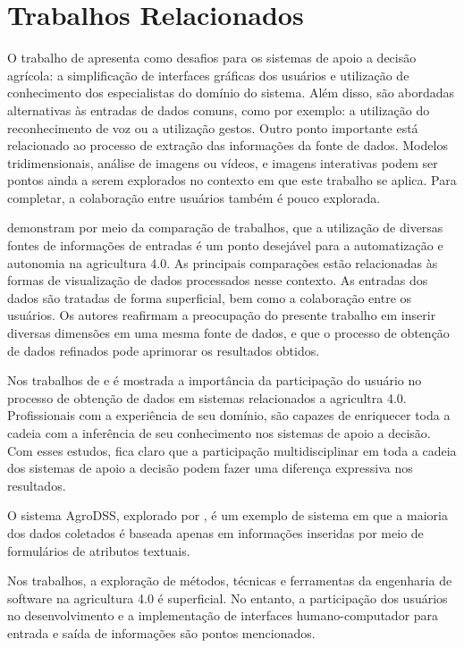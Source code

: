\documentclass[12pt]{article}
\begin{document}
\section{Trabalhos Relacionados}
\label{sec:trabalhos_relacionados}

O trabalho de  apresenta como desafios para os sistemas de apoio a decisão agrícola: a simplificação de interfaces gráficas dos usuários e utilização de conhecimento dos especialistas do domínio do sistema. Além disso, são abordadas alternativas às entradas de dados comuns, como por exemplo: a utilização do reconhecimento de voz ou a utilização gestos. Outro ponto importante está relacionado ao processo de extração das informações da fonte de dados. Modelos tridimensionais, análise de imagens ou vídeos, e imagens interativas podem ser pontos ainda a serem explorados no contexto em que este trabalho se aplica. Para completar, a colaboração entre usuários também é pouco explorada.

 demonstram por meio da comparação de trabalhos, que a utilização de diversas fontes de informações de entradas é um ponto desejável para a automatização e autonomia na agricultura 4.0. As principais comparações estão relacionadas às formas de visualização de dados processados nesse contexto. As entradas dos dados são tratadas de forma superficial, bem como a colaboração entre os usuários. Os autores reafirmam a preocupação do presente trabalho em inserir diversas dimensões em uma mesma fonte de dados, e que o processo de obtenção de dados refinados pode aprimorar os resultados obtidos.

Nos trabalhos de  e  é mostrada a importância da participação do usuário no processo de obtenção de dados em sistemas relacionados a agricultra 4.0. Profissionais com a experiência de seu domínio, são capazes de enriquecer toda a cadeia com a inferência de seu conhecimento nos sistemas de apoio a decisão. Com esses estudos, fica claro que a participação multidisciplinar em toda a cadeia dos sistemas de apoio a decisão podem fazer uma diferença expressiva nos resultados.

O sistema AgroDSS, explorado por , é um exemplo de sistema em que a maioria dos dados coletados é baseada apenas em informações inseridas por meio de formulários de atributos textuais.

Nos trabalhos, a exploração de métodos, técnicas e ferramentas da engenharia de software na agricultura 4.0 é superficial. No entanto, a participação dos usuários no desenvolvimento e a implementação de interfaces humano-computador para entrada e saída de informações são pontos mencionados.
\end{document}
